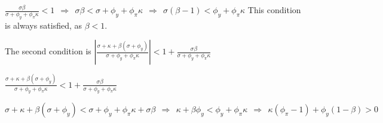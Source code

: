 \documentclass[
]{article}
\begin{document}
\(\displaystyle \frac{\sigma \beta}{\sigma+ \phi_y+\phi_\pi \kappa} <1 \ \ \Rightarrow \ \ \sigma \beta<\sigma+ \phi_y+\phi_\pi \kappa \ \ \Rightarrow \ \ \sigma (\beta-1)< \phi_y+\phi_\pi \kappa\)
This condition is always satisfied, as \(\beta<1\).

The second condition is
\(\displaystyle \left| \frac{\sigma+\kappa+ \beta(\sigma+\phi_y)}{\sigma+ \phi_y+\phi_\pi \kappa} \right|<1+\frac{\sigma \beta}{\sigma+ \phi_y+\phi_\pi \kappa}\)

\(\displaystyle \frac{\sigma+\kappa+ \beta(\sigma+\phi_y)}{\sigma+ \phi_y+\phi_\pi \kappa} < 1+\frac{\sigma \beta}{\sigma+ \phi_y+\phi_\pi \kappa}\)

\(\sigma+\kappa+ \beta(\sigma+\phi_y) < \sigma+ \phi_y+\phi_\pi \kappa + \sigma \beta \ \ \Rightarrow \ \ \kappa + \beta \phi_y<\phi_y+\phi_\pi \kappa \ \ \Rightarrow \ \ \kappa (\phi_\pi-1)+\phi_y(1-\beta)>0\)
\end{document}

